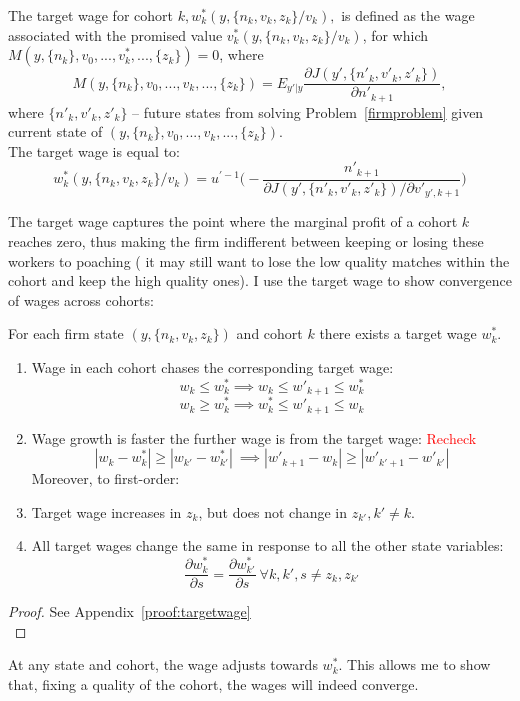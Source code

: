  \begin{definition} 
  The target wage for cohort $k, w^*_k(y,\{n_k,v_k,z_k\}/v_k),$ is defined as the wage associated with the promised value $v^*_k(y,\{n_k,v_k,z_k\}/v_k)$, for which $M(y,\{n_k\},v_0,...,v^*_k,...,\{z_k\})=0$, where
  \[M(y,\{n_k\},v_0,...,v_k,...,\{z_k\}) = E_{y'|y}\frac{\partial J(y',\{n'_k,v'_k,z'_k\})}{\partial n'_{k+1}},\]
  where $\{n'_k,v'_k,z'_k\}$ -- future states from solving Problem~\ref{firmproblem} given current state of $(y,\{n_k\},v_0,...,v_k,...,\{z_k\})$. \\
  The target wage is equal to:
  \[ w^*_k (y,\{n_k,v_k,z_k\}/v_k) = u^{'-1}\Big( - \frac{n'_{k+1}}{\partial J(y',\{n'_k,v'_k,z'_k\})/\partial v'_{y',k+1}} \Big)\]
 \end{definition}
The target wage captures the point where the marginal profit of a cohort $k$ reaches zero, thus making the firm indifferent between keeping or losing these workers to poaching ( it may still want to lose the low quality matches within the cohort and keep the high quality ones). I use the target wage to show convergence of wages across cohorts:
\begin{proposition} \label{prop:targetwage}
 For each firm state $(y,\{n_k,v_k,z_k\})$ and cohort $k$ there exists a target wage $w^*_k$. 
  \begin{enumerate}
    \item Wage in each cohort chases the corresponding target wage: 
    \[ w_k \leq w^*_k  \implies w_k \leq w'_{k+1} \leq w^*_k\]
    \[w_k \geq w^*_k  \implies w^*_k \leq w'_{k+1} \leq w_k\]
    \item Wage growth is faster the further wage is from the target wage: \textcolor{red}{Recheck} 
    \[|w_k-w^*_k|\geq|w_{k'}-w^*_{k'}|\: \implies |w'_{k+1}-w_k|\geq|w'_{k'+1}-w'_{k'}| \]
    Moreover, to first-order:
    \item Target wage increases in $z_k$, but does not change in $z_{k'},k'\neq k$.
    \item All target wages change the same in response to all the other state variables:
    \[\frac{\partial w^*_k}{\partial s} = \frac{\partial w^*_{k'}}{\partial s}\:  \forall k,k', s\neq z_k,z_{k'}\]
  \end{enumerate}
\end{proposition}
\begin{proof}
  See Appendix~\ref{proof:targetwage} \\

\end{proof}
At any state and cohort, the wage adjusts towards $w^*_k$. This allows me to show that, fixing a quality of the cohort, the wages will indeed converge.
